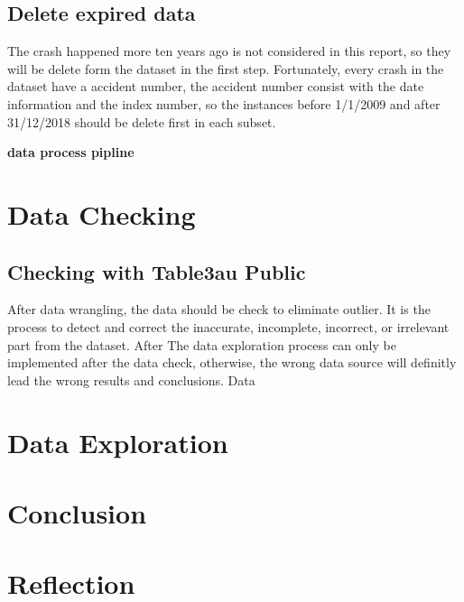 \documentclass[11pt]{article}
\theoremstyle{definition}
\begin{document}
\subsection{Delete expired data}
The crash happened more ten years ago is not considered in this report, so they will be delete form the dataset in the first step. Fortunately, every crash in the dataset have a accident number, the accident number consist with the date information and the index number, so the instances before 1/1/2009 and after 31/12/2018 should be delete first in each subset.  

\textbf{data process pipline}

\section{Data Checking}
\label{dataChecking}
\subsection{Checking with Table3au Public}
After data wrangling, the data should be check to eliminate outlier. It is the process to detect and correct the inaccurate, incomplete, incorrect, or irrelevant part from the dataset. After 
The data exploration process can only be implemented after the data check, otherwise, the wrong data source will definitly lead the wrong results and conclusions. Data 

\section{Data Exploration}
\label{dataExploration}


\section{Conclusion}

\section{Reflection}
\end{document}
